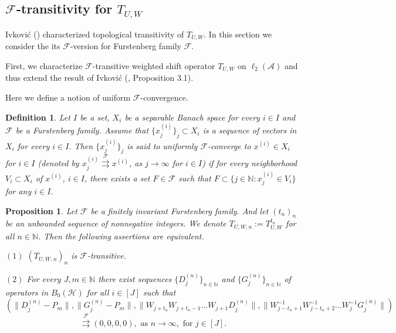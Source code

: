 \documentclass{article}
\newtheorem {proposition}[theorem]{Proposition}
\newtheorem {definition}[theorem]{Definition}
\begin{document}
\subsection{$\mathcal{F}$-transitivity for $T_{U,W}$}

Ivkovi\'{c} (\cite{I24}) characterized topological transitivity of $T_{U, W}$. In this section we consider the its $\mathcal{F}$-version for Furstenberg family $\mathcal{F}$.



First, we characterize $\mathcal{F}$-transitive weighted shift operator $T_{U, W}$ on $\ell_{2}(\mathcal{A})$ and thus extend the result of Ivkovi\'{c} (\cite{I24}, Proposition 3.1).

Here we define a notion of uniform $\mathcal{F}$-convergence.

\begin{definition}\textnormal{
Let $I$ be a set, $X_{i}$ be a separable Banach space  for every $i\in I$ and $\mathcal{F}$ be a Furstenberg family.
Assume that  $\{x^{(i)}_{j}\}_{j}\subset X_{i}$ is a sequence of vectors in $X_{i}$ for every $i\in I$. Then $\{x^{(i)}_{j}\}_{j}$ is said to \textit{uniformly $\mathcal{F}$-converge to} $x^{(i)}\in X_{i}$ \textit{for} $i\in I$ (denoted by $x^{(i)}_{j}\stackrel{\mathcal F}{\rightrightarrows} x^{(i)}$, as $j\rightarrow \infty$ for $i\in I$) if for every neighborhood $V_{i}\subset X_{i}$ of $x^{(i)}$, $i\in I$, there exists a set $F\in \mathcal{F}$ such that  $F\subset\{j\in \mathbb{N}:x^{(i)}_{j}\in V_{i}\}$ for any $i\in I$.}
\end{definition}

\begin{proposition}\label{pro3.1}
Let $\mathcal{F}$ be a finitely invariant Furstenberg family. And let $(t_{n})_{n}$ be an unbounded sequence of nonnegative integers. We denote $T_{U,W,n}:=T^{t_{n}}_{U,W}$ for all $n\in \mathbb{N}$. Then the following assertions are equivalent.

$(1)$ $(T_{U,W,n})_{n}$ is $\mathcal{F}$-transitive.

$(2)$ For every $J,m\in\mathbb{N}$ there exist sequences $\{D^{(n)}_{j}\}_{n\in\mathbb{N}}$ and $\{G^{(n)}_{j}\}_{n\in\mathbb{N}}$  of operators in $B_{0}(\mathcal{H})$ for all $i\in[J]$ such that
\[\left(\|D^{(n)}_{j}-P_{m}\|, \|G^{(n)}_{j}-P_{m}\|, \|W_{j+t_{n}}W_{j+t_{n}-1}...W_{j+1}D^{(n)}_{j}\|, \|W^{-1}_{j-t_{n}+1}W^{-1}_{j-t_{n}+2}...W^{-1}_{j}G^{(n)}_{j}\|\right)\]
\[\stackrel{\mathcal F}{\rightrightarrows} (0,0,0,0), \textrm{ as }  n\rightarrow\infty, \textrm{ for } j\in [J].\]
\end{proposition}
\end{document}
